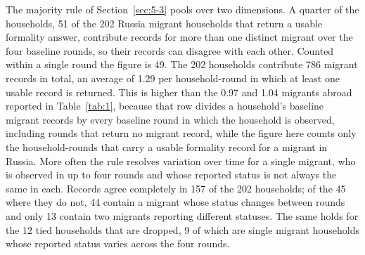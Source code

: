 The majority rule of Section~\ref{sec:5-3} pools over two dimensions. A quarter of the households, 51 of the 202 Russia migrant households that return a usable formality answer, contribute records for more than one distinct migrant over the four baseline rounds, so their records can disagree with each other. Counted within a single round the figure is 49. The 202 households contribute 786 migrant records in total, an average of 1.29 per household-round in which at least one usable record is returned. This is higher than the 0.97 and 1.04 migrants abroad reported in Table~\ref{tab:1}, because that row divides a household's baseline migrant records by every baseline round in which the household is observed, including rounds that return no migrant record, while the figure here counts only the household-rounds that carry a usable formality record for a migrant in Russia. More often the rule resolves variation over time for a single migrant, who is observed in up to four rounds and whose reported status is not always the same in each. Records agree completely in 157 of the 202 households; of the 45 where they do not, 44 contain a migrant whose status changes between rounds and only 13 contain two migrants reporting different statuses. The same holds for the 12 tied households that are dropped, 9 of which are single migrant households whose reported status varies across the four rounds.

